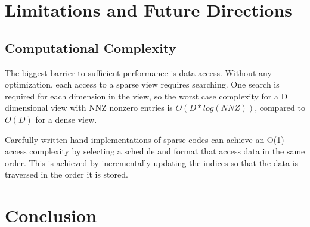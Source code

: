 \section{Limitations and Future Directions}

\subsection{Computational Complexity}
The biggest barrier to sufficient performance is data access. Without any optimization, each access to a sparse view requires searching. One search is required for each dimension in the view, so the worst case complexity for a D dimensional view with NNZ nonzero entries is $O( D*log(NNZ))$, compared to $O(D)$ for a dense view. 

Carefully written hand-implementations of sparse codes can achieve an O(1) access complexity by selecting a schedule and format that access data in the same order. This is achieved by incrementally updating the indices so that the data is traversed in the order it is stored. 



\section{Conclusion}















